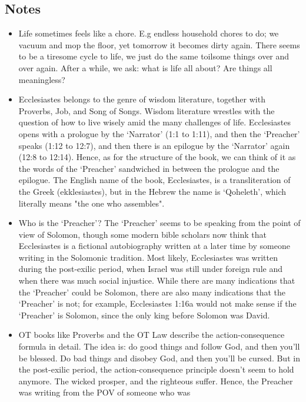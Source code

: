 \subsection*{Notes}
\begin{itemize}
  \item{Life sometimes feels like a chore.  E.g endless household chores to
  do; we vacuum and mop the floor, yet tomorrow it becomes dirty again.
  There seems to be a tiresome cycle to life, we just do the same toilsome
  things over and over again.  After a while, we ask: what is life all about?
  Are things all meaningless?}
  \item{Ecclesiastes belongs to the genre of wisdom literature, together with
  Proverbs, Job, and Song of Songs.  Wisdom literature wrestles with the
  question of how to live wisely amid the many challenges of life.
  Ecclesiastes opens with a prologue by the `Narrator' (1:1 to 1:11), and
  then the `Preacher' speaks (1:12 to 12:7), and then there is an epilogue by
  the `Narrator' again (12:8 to 12:14).  Hence, as for the structure of the
  book, we can think of it as the words of the `Preacher' sandwiched in
  between the prologue and the epilogue.  The English name of the book,
  Ecclesiastes, is a transliteration of the Greek (ekklesiastes), but in the
  Hebrew the name is `Qoheleth', which literally means "the one who
  assembles".}
  \item{Who is the `Preacher'?  The `Preacher' seems to be speaking from the
  point of view of Solomon, though some modern bible scholars now think that
  Ecclesiastes is a fictional autobiography written at a later time by
  someone writing in the Solomonic tradition.  Most likely, Ecclesiastes was
  written during the post-exilic period, when Israel was still under foreign
  rule and when there was much social injustice.  While there are many
  indications that the `Preacher' could be Solomon, there are also many
  indications that the `Preacher' is not; for example, Ecclesiastes 1:16a
  would not make sense if the `Preacher' is Solomon, since the only king
  before Solomon was David.}
  \item{OT books like Proverbs and the OT Law describe the action-consequence
  formula in detail.  The idea is: do good things and follow God, and then
  you'll be blessed.  Do bad things and disobey God, and then you'll be
  cursed.  But in the post-exilic period, the action-consequence principle
  doesn't seem to hold anymore.  The wicked prosper, and the righteous
  suffer.  Hence, the Preacher was writing from the POV of someone who was
}
\end{itemize}
